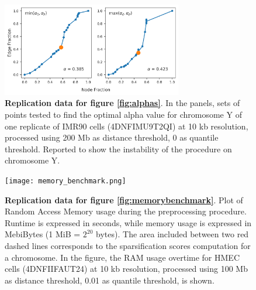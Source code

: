 \begin{figure}[h]
  \centering 
  \includegraphics[width=0.7\textwidth]{alphas_rep2.png}
  \caption{\textbf{Replication data for figure \ref{fig:alphas}}. In the panels, sets of points tested to find the optimal alpha value for chromosome Y of one replicate of IMR90 cells (4DNFIMU9T2QI) at 10 kb resolution, processed using 200 Mb as distance threshold, 0 as quantile threshold. Reported to show the instability of the procedure on chromosome Y.}
\end{figure}

\begin{figure}[h]
  \centering 
  \texttt{[image: memory\_benchmark.png]}
  \caption{\textbf{Replication data for figure \ref{fig:memorybenchmark}}. Plot of Random Access Memory usage during the preprocessing procedure. Runtime is expressed in seconds, while memory usage is expressed in MebiBytes (1 MiB = $2^{20}$ bytes). The area included between two red dashed lines corresponds to the sparsification scores computation for a chromosome. In the figure, the RAM usage overtime for HMEC cells (4DNFIIFAUT24) at 10 kb resolution, processed using 100 Mb as distance threshold, 0.01 as quantile threshold, is shown.}
\end{figure}